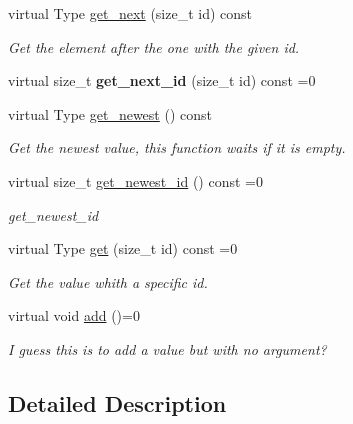 \begin{DoxyCompactItemize}
\item 
virtual Type \hyperlink{classreal__time__tools_1_1ThreadsafeHistoryInterface_af9541280de2b560e833b826befb0545d}{get\+\_\+next} (size\+\_\+t id) const
\begin{DoxyCompactList}\small\item\em Get the element after the one with the given id. \end{DoxyCompactList}\item 
\mbox{\label{classreal__time__tools_1_1ThreadsafeHistoryInterface_a8b2e92985bb4799f557f55550c7783dd}} 
virtual size\+\_\+t {\bfseries get\+\_\+next\+\_\+id} (size\+\_\+t id) const =0
\item 
virtual Type \hyperlink{classreal__time__tools_1_1ThreadsafeHistoryInterface_a4a3264f37257d8cd48e4d6975ffdf9d7}{get\+\_\+newest} () const
\begin{DoxyCompactList}\small\item\em Get the newest value, this function waits if it is empty. \end{DoxyCompactList}\item 
virtual size\+\_\+t \hyperlink{classreal__time__tools_1_1ThreadsafeHistoryInterface_a3455ddd9e556045b17ab05307f4d3f51}{get\+\_\+newest\+\_\+id} () const =0
\begin{DoxyCompactList}\small\item\em get\+\_\+newest\+\_\+id \end{DoxyCompactList}\item 
virtual Type \hyperlink{classreal__time__tools_1_1ThreadsafeHistoryInterface_a34424c202bd02b70bb2178f506a67602}{get} (size\+\_\+t id) const =0
\begin{DoxyCompactList}\small\item\em Get the value whith a specific id. \end{DoxyCompactList}\item 
virtual void \hyperlink{classreal__time__tools_1_1ThreadsafeHistoryInterface_a3304dfddbf562b835745be3ff363ab17}{add} ()=0
\begin{DoxyCompactList}\small\item\em I guess this is to add a value but with no argument? \end{DoxyCompactList}\end{DoxyCompactItemize}


\subsection{Detailed Description}
